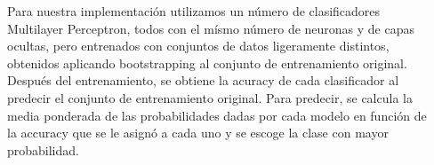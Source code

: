 \documentclass[25pt,landscape]{tikzposter}
\begin{document}
\begin{columns}
{		\paragraph{}Para nuestra implementación utilizamos un número de clasificadores Multilayer Perceptron, todos con el mísmo número de neuronas y de capas ocultas, pero entrenados con conjuntos de datos ligeramente distintos, obtenidos aplicando bootstrapping al conjunto de entrenamiento original. Después del entrenamiento, se obtiene la acuracy de cada clasificador al predecir el conjunto de entrenamiento original. Para predecir, se calcula la media ponderada de las probabilidades dadas por cada modelo en función de la accuracy que se le asignó a cada uno y se escoge la clase con mayor probabilidad.
    }

    
\end{columns}
 	
\end{document}
